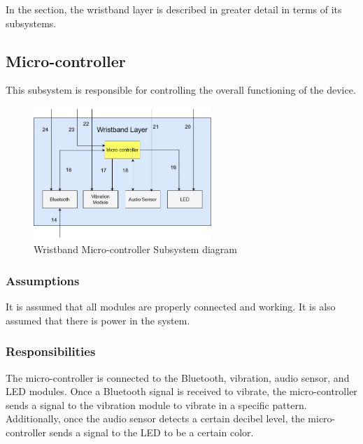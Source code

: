 In the section, the wristband layer is described in greater detail in terms of its subsystems.


\subsection{Micro-controller}
This subsystem is responsible for controlling the overall functioning of the device.

\begin{figure}[h!]
	\centering
 	\includegraphics[width=0.60\textwidth]{images/wristband-micro.jpg}
 \caption{Wristband Micro-controller Subsystem diagram}
\end{figure}

\subsubsection{Assumptions}
It is assumed that all modules are properly connected and working. It is also assumed that there is power in the system.

\subsubsection{Responsibilities}
The micro-controller is connected to the Bluetooth, vibration, audio sensor, and LED modules. Once a Bluetooth signal is received to vibrate, the micro-controller sends a signal to the vibration module to vibrate in a specific pattern. Additionally, once the audio sensor detects a certain decibel level, the micro-controller sends a signal to the LED to be a certain color.

